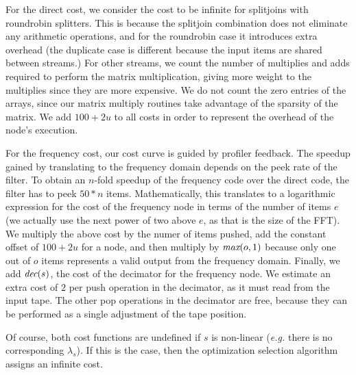 \clearpage
For the direct cost, we consider the cost to be infinite for
splitjoins with roundrobin splitters.  This is because the splitjoin
combination does not eliminate any arithmetic operations, and for the
roundrobin case it introduces extra overhead (the duplicate case is
different because the input items are shared between streams.)  For
other streams, we count the number of multiplies and adds required to
perform the matrix multiplication, giving more weight to the
multiplies since they are more expensive.  We do not count the zero
entries of the arrays, since our matrix multiply routines take
advantage of the sparsity of the matrix.  We add $100+2u$ to all costs
in order to represent the overhead of the node's execution.

For the frequency cost, our cost curve is guided by profiler feedback.
The speedup gained by translating to the frequency domain depends on
the peek rate of the filter.  To obtain an $n$-fold speedup of the
frequency code over the direct code, the filter has to peek $50*n$
items.  Mathematically, this translates to a logarithmic expression
for the cost of the frequency node in terms of the number of items $e$
(we actually use the next power of two above $e$, as that is the size
of the FFT).  We multiply the above cost by the numer of items pushed,
add the constant offset of $100+2u$ for a node, and then multiply by
$\mbox{\it max}(o, 1)$ because only one out of $o$ items represents a valid
output from the frequency domain.  Finally, we add $\mbox{\it dec}(s)$, the
cost of the decimator for the frequency node.  We estimate an extra
cost of $2$ per push operation in the decimator, as it must read from
the input tape.  The other pop operations in the decimator are free,
because they can be performed as a single adjustment of the tape
position.

Of course, both cost functions are undefined if $s$ is non-linear
({\it e.g.} there is no corresponding $\lambda_s$). If this is the
case, then the optimization selection algorithm assigns an infinite
cost.


